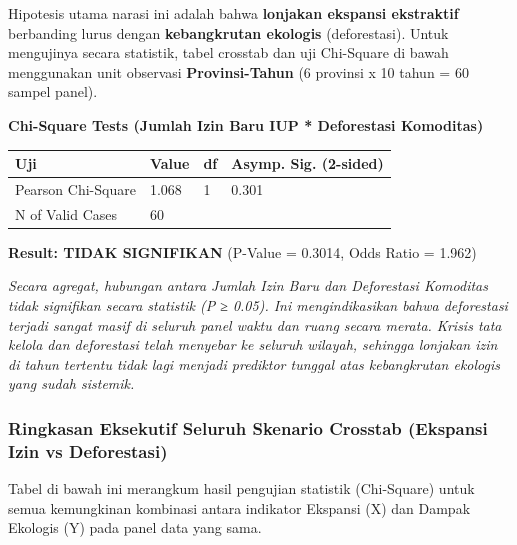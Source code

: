 \documentclass[
]{article}
\newcounter{none} %
\begin{document}
Hipotesis utama narasi ini adalah bahwa \textbf{lonjakan ekspansi
ekstraktif} berbanding lurus dengan \textbf{kebangkrutan ekologis}
(deforestasi). Untuk mengujinya secara statistik, tabel crosstab dan uji
Chi-Square di bawah menggunakan unit observasi \textbf{Provinsi-Tahun}
(6 provinsi x 10 tahun = 60 sampel panel).

\textbf{Chi-Square Tests (Jumlah Izin Baru IUP * Deforestasi Komoditas)}

{\def\LTcaptype{none} %
\begin{longtable}[]{@{}llll@{}}
\toprule\noalign{}
Uji & Value & df & Asymp. Sig. (2-sided) \\
\midrule\noalign{}
\endhead
\bottomrule\noalign{}
\endlastfoot
Pearson Chi-Square & 1.068 & 1 & 0.301 \\
N of Valid Cases & 60 & & \\
\end{longtable}
}

\textbf{Result: TIDAK SIGNIFIKAN} (P-Value = 0.3014, Odds Ratio = 1.962)

\emph{Secara agregat, hubungan antara Jumlah Izin Baru dan Deforestasi
Komoditas tidak signifikan secara statistik (P ≥ 0.05). Ini
mengindikasikan bahwa deforestasi terjadi sangat masif di seluruh panel
waktu dan ruang secara merata. Krisis tata kelola dan deforestasi telah
menyebar ke seluruh wilayah, sehingga lonjakan izin di tahun tertentu
tidak lagi menjadi prediktor tunggal atas kebangkrutan ekologis yang
sudah sistemik.}

\subsubsection{Ringkasan Eksekutif Seluruh Skenario Crosstab (Ekspansi
Izin vs
Deforestasi)}\label{ringkasan-eksekutif-seluruh-skenario-crosstab-ekspansi-izin-vs-deforestasi}

Tabel di bawah ini merangkum hasil pengujian statistik (Chi-Square)
untuk semua kemungkinan kombinasi antara indikator Ekspansi (X) dan
Dampak Ekologis (Y) pada panel data yang sama.
\end{document}
